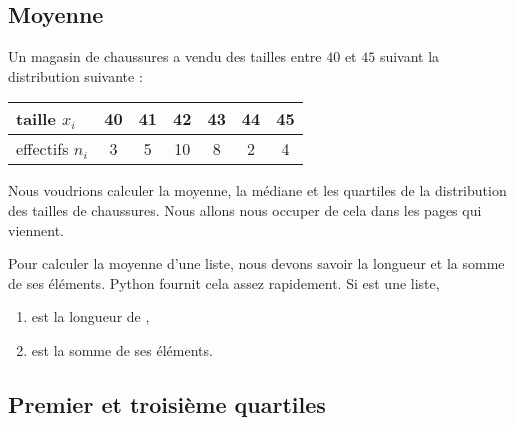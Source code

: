 \subsection{Moyenne}

\begin{example}     \label{ExerfDMnv}
    Un magasin de chaussures a vendu des tailles entre \( 40\) et \( 45\) suivant la distribution suivante :
    \begin{center}
        \begin{tabular}{|l||c|c|c|c|c|c|}
            \hline
            taille \( x_i\)&40&41&42&43&44&45\\
            \hline
            effectifs \( n_i\)&3&5&10&8&2&4\\
            \hline
        \end{tabular}
    \end{center}
    Nous voudrions calculer la moyenne, la médiane et les quartiles de la distribution des tailles de chaussures. Nous allons nous occuper de cela dans les pages qui viennent.
\end{example}
    
    Pour calculer la moyenne d'une liste, nous devons savoir la longueur et la somme de ses éléments. Python fournit cela assez rapidement. Si  est une liste,
    \begin{enumerate}
        \item
             est la longueur de ,
        \item
             est la somme de ses éléments.
    \end{enumerate}
    
\subsection{Premier et troisième quartiles}

